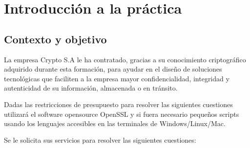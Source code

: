 \chapter{Introducción a la práctica}
\label{sec:introduccion}

\section{Contexto y objetivo}
La empresa Crypto S.A le ha contratado, gracias a su conocimiento criptográfico adquirido
durante esta formación, para ayudar en el diseño de soluciones tecnológicas que faciliten a
la empresa mayor confidencialidad, integridad y autenticidad de su información, almacenada o en tránsito.

Dadas las restricciones de presupuesto para resolver las siguientes cuestiones utilizará el
software opensource OpenSSL y si fuera necesario pequeños scripts usando los lenguajes
accesibles en las terminales de Windows/Linux/Mac.

Se le solicita sus servicios para resolver las siguientes cuestiones:
